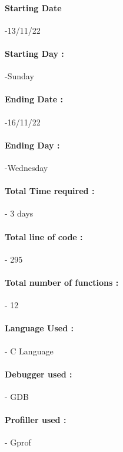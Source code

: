 \documentclass[12pt,a4paper]{article}
\begin{document}
\paragraph{Starting Date}-13/11/22
\\
\paragraph{Starting Day :}-Sunday
\\
\paragraph{Ending Date :}-16/11/22
\\
\paragraph{Ending Day :}-Wednesday
\\
\paragraph{Total Time required :}- 3 days
\\
\paragraph{Total line of code :}-  295 
\\
\paragraph{Total number of functions :}- 12
\\
\paragraph{Language Used :}- C Language
\\
\paragraph{Debugger used :}- GDB
\\
\paragraph{Profiller used :}- Gprof
\\
\end{document}
